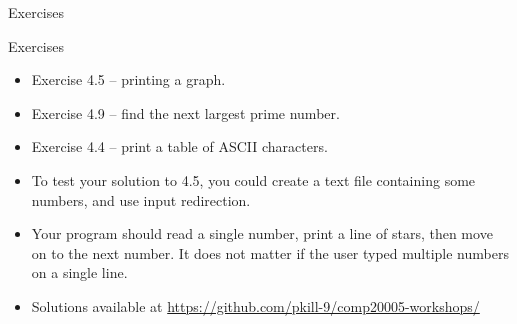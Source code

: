 \documentclass{beamer}
\begin{document}
\begin{frame}{Exercises}
    \begin{block}{Exercises}
        \begin{itemize}
            \item Exercise 4.5 -- printing a graph.
            \item Exercise 4.9 -- find the next largest prime number.
            \item Exercise 4.4 -- print a table of ASCII characters.
        \end{itemize}
    \end{block}
    \begin{itemize}
        \item To test your solution to 4.5, you could create a text file
            containing some numbers, and use input redirection.
        \item Your program should read a single number, print a line of
            stars, then move on to the next number. It does not matter if
            the user typed multiple numbers on a single line.
        \item Solutions available at \url{https://github.com/pkill-9/comp20005-workshops/}
    \end{itemize}
\end{frame}

%
%
\end{document}
